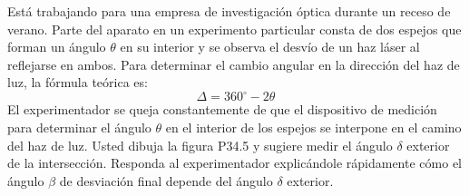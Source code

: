 \item Está trabajando para una empresa de investigación óptica durante un receso de verano. Parte del aparato en un experimento particular consta de dos espejos que forman un ángulo $\theta$ en su interior y se observa el desvío de un haz láser al reflejarse en ambos. Para determinar el cambio angular en la dirección del haz de luz, la fórmula teórica es:
$$ \Delta = 360^\circ - 2\theta $$
El experimentador se queja constantemente de que el dispositivo de medición para determinar el ángulo $\theta$ en el interior de los espejos se interpone en el camino del haz de luz. Usted dibuja la figura P34.5 y sugiere medir el ángulo $\delta$ exterior de la intersección. Responda al experimentador explicándole rápidamente cómo el ángulo $\beta$ de desviación final depende del ángulo $\delta$ exterior.